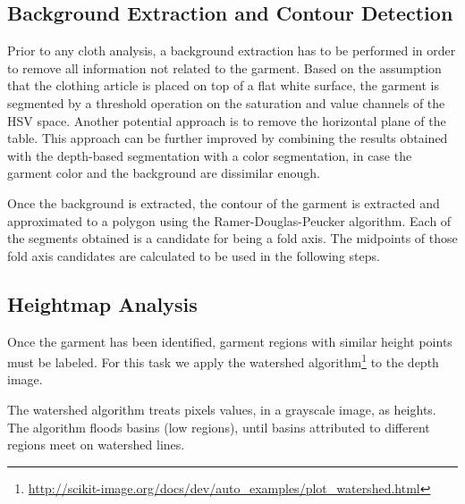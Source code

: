 \subsection{Background Extraction and Contour Detection}
Prior to any cloth analysis, a background extraction has to be performed in order to remove all information not related to the garment.
Based on the assumption that the clothing article is placed on top of a flat white surface, the garment is segmented by a threshold operation on the saturation and value channels of the HSV space. Another potential approach is to remove the horizontal plane of the table. This approach can be further improved by combining the results obtained with the depth-based segmentation with a color segmentation, in case the garment color and the background are dissimilar enough.

Once the background is extracted, the contour of the garment is extracted and approximated to a polygon using the Ramer-Douglas-Peucker algorithm. Each of the segments obtained is a candidate for being a fold axis. The midpoints of those fold axis candidates are calculated to be used in the following steps.


\subsection{Heightmap Analysis}
Once the garment has been identified, garment regions with similar height points must be labeled. For this task we apply the watershed algorithm\footnote{\url{http://scikit-image.org/docs/dev/auto_examples/plot_watershed.html}}  to the depth image. 

The watershed algorithm treats pixels values, in a grayscale image, as heights. The algorithm floods basins (low regions), until basins attributed to different regions meet on watershed lines. 

%
%


